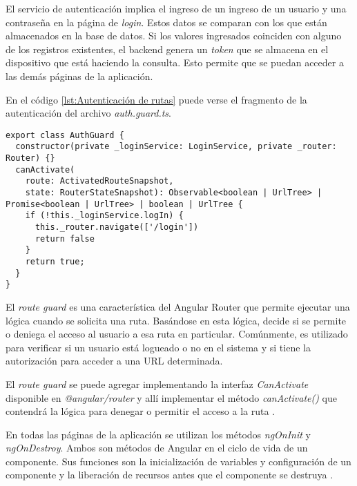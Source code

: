 El servicio de autenticación implica el ingreso de un ingreso de un usuario y una contraseña en la página de \textit{login}. Estos datos se comparan con los que están almacenados en la base de datos. Si los valores ingresados coinciden con alguno de los registros existentes, el backend genera un \textit{token} que se almacena en el dispositivo que está haciendo la consulta. Esto permite que se puedan acceder a las demás páginas de la aplicación.

En el código \ref{lst:Autenticación de rutas} puede verse el fragmento de la autenticación del archivo \textit{auth.guard.ts}.



\begin{lstlisting}[caption={Autenticación de rutas.}, label={lst:Autenticación de rutas}]
export class AuthGuard {
  constructor(private _loginService: LoginService, private _router: Router) {}
  canActivate(
    route: ActivatedRouteSnapshot,
    state: RouterStateSnapshot): Observable<boolean | UrlTree> | Promise<boolean | UrlTree> | boolean | UrlTree {
    if (!this._loginService.logIn) {
      this._router.navigate(['/login'])
      return false
    }
    return true;
  }
}
\end{lstlisting}

El \textit{route guard} es una característica del Angular Router que permite ejecutar una lógica cuando se solicita una ruta. Basándose en esta lógica, decide si se permite o deniega el acceso al usuario a esa ruta en particular. Comúnmente, es utilizado para verificar si un usuario está logueado o no en el sistema y si tiene la autorización para acceder a una URL determinada.

El \textit{route guard} se puede agregar implementando la interfaz \textit{CanActivate} disponible en \textit{@angular/router} y allí implementar el método \textit{canActivate()} que contendrá la lógica para denegar o permitir el acceso a la ruta \citep{24}.

En todas las páginas de la aplicación se utilizan los métodos \textit{ngOnInit} y \textit{ngOnDestroy}. Ambos son métodos de Angular en el ciclo de vida de un componente. Sus funciones son la inicialización de variables y configuración de un componente y la liberación de recursos antes que el componente se destruya \citep{25}.


